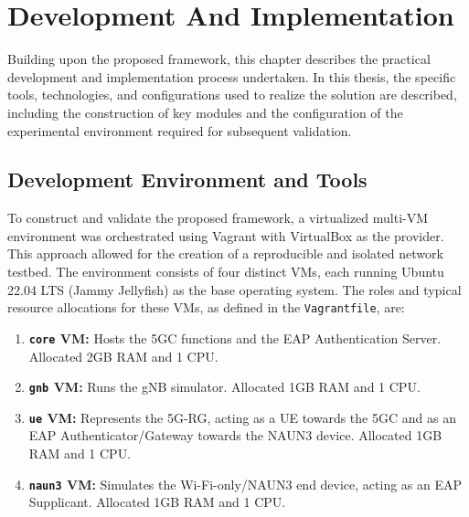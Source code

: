 \chapter{Development And Implementation}%
\label{chapter:development-and-implementation}

\begin{introduction}
Building upon the proposed framework, this chapter describes the practical development and implementation process undertaken. In this thesis, the specific tools, technologies, and configurations used to realize the solution are described, including the construction of key modules and the configuration of the experimental environment required for subsequent validation.
\end{introduction}

\section{Development Environment and Tools}

To construct and validate the proposed framework, a virtualized multi-\ac{VM} environment was orchestrated using Vagrant with VirtualBox as the provider. This approach allowed for the creation of a reproducible and isolated network testbed. The environment consists of four distinct \acp{VM}, each running Ubuntu 22.04 LTS (Jammy Jellyfish) as the base operating system. The roles and typical resource allocations for these \acp{VM}, as defined in the \texttt{Vagrantfile}, are:

\begin{enumerate}
    \item \textbf{\texttt{core} \ac{VM}:} Hosts the \ac{5GC} functions and the \ac{EAP} Authentication Server. Allocated 2\ac{GB} \ac{RAM} and 1 \ac{CPU}.

    \item \textbf{\texttt{gnb} \ac{VM}:} Runs the \ac{gNB} simulator. Allocated 1\ac{GB} \ac{RAM} and 1 \ac{CPU}.

    \item \textbf{\texttt{ue} \ac{VM}:} Represents the \ac{5G-RG}, acting as a \ac{UE} towards the \ac{5GC} and as an \ac{EAP} Authenticator/Gateway towards the \ac{NAUN3} device. Allocated 1\ac{GB} \ac{RAM} and 1 \ac{CPU}.

    \item \textbf{\texttt{naun3} \ac{VM}:} Simulates the Wi-Fi-only/\ac{NAUN3} end device, acting as an \ac{EAP} Supplicant. Allocated 1\ac{GB} \ac{RAM} and 1 \ac{CPU}.
\end{enumerate}


